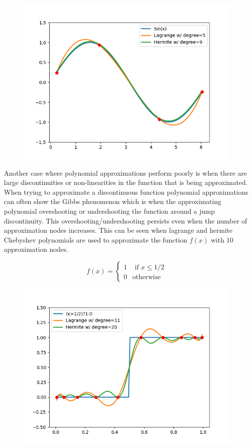 \documentclass[12pt]{article}
\begin{document}
\begin{figure}[H]
  \centering
  \includegraphics[scale=.8]{plot_Cheb_Sin_Func}
\end{figure}

Another case where polynomial approximations perform poorly is when there are large discontinuities or non-linearities in the function that is being approximated. When trying to approximate a discontinuous function polynomial approximations can often show the Gibbs phenomenon which is when the approximating polynomial overshooting or undershooting the function around a jump discontinuity. This overshooting/undershooting persists even when the number of approximation nodes increases. This can be seen when lagrange and hermite Chebyshev polynomials are used to approximate the function $f(x)$ with 10 approximation nodes.

\begin{equation}
  \label{ind_func}
  f(x)=\begin{cases}
    1 & \text{ if } x\leq1/2\\
    0 & \text{otherwise}
  \end{cases}
\end{equation}

\begin{figure}[H]
  \centering
  \includegraphics[scale=.8]{plot_Cheb_Ind_Func}
\end{figure}
\end{document}
